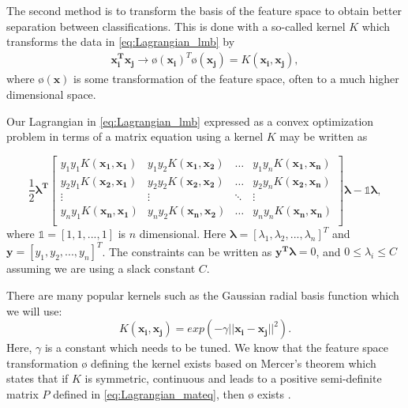 The second method is to transform the basis of the feature space to obtain 
better separation between classifications. This is done with a so-called 
kernel $K$ which transforms the data in \autoref{eq:Lagrangian_lmb} by 
\begin{gather*}
\boldsymbol{x_i^Tx_j} \rightarrow ø(\boldsymbol{x_i})^Tø(\boldsymbol{x_j})=K(\boldsymbol{x_i,x_j}),
\end{gather*}
where $ø(\boldsymbol{x})$ is some transformation of the feature space, often to a much 
higher dimensional space.

Our Lagrangian in \autoref{eq:Lagrangian_lmb} expressed as a convex optimization 
problem in terms of a matrix equation using a kernel $K$ may be written as \cite{w46}

\begin{equation}
\frac{1}{2}\boldsymbol{\lambda ^T}
\begin{bmatrix}
	 y_1y_1K(\boldsymbol{x_1,x_1})  & y_1y_2K(\boldsymbol{x_1,x_2}) & \hdots & y_1y_nK(\boldsymbol{x_1,x_n}) \\
	 y_2y_1K(\boldsymbol{x_2,x_1})  & y_2y_2K(\boldsymbol{x_2,x_2}) & \hdots & y_2y_nK(\boldsymbol{x_2,x_n}) \\
	\vdots & \vdots & \ddots & \vdots \\
	 y_ny_1K(\boldsymbol{x_n,x_1})  & y_ny_2K(\boldsymbol{x_n,x_2}) & \hdots & y_ny_nK(\boldsymbol{x_n,x_n}) \\
\end{bmatrix}
\boldsymbol{\lambda }-\mathbb{1}\boldsymbol{\lambda },
\label{eq:Lagrangian_mateq}
\end{equation}
where $\mathbb{1}=[1,1,...,1]$ is $n$ dimensional. Here $\boldsymbol{\lambda }=[\lambda _1,\lambda _2,...,\lambda _n]^T$ 
and $\boldsymbol{y}=[y_1,y_2,...,y_n]^T$. The constraints can be written as 
$\boldsymbol{y^T\lambda }=0$, and $0 \le \lambda _i \le C$ assuming we are using 
a slack constant $C$.  

There are many popular kernels such as the Gaussian radial basis function which 
we will use:
\begin{equation}
K(\boldsymbol{x_i,x_j})=exp(-\gamma ||\boldsymbol{x_i-x_j}||^2).
\label{eq:grbf}
\end{equation}
Here, $\gamma $ is a constant which needs to be tuned.
We know that the feature space transformation $ø$ defining the kernel exists based 
on Mercer's theorem which states that if $K$ is symmetric, continuous and leads to 
a positive semi-definite matrix $P$ defined in \autoref{eq:Lagrangian_mateq}, then 
$ø$ exists \cite{w46}. 


